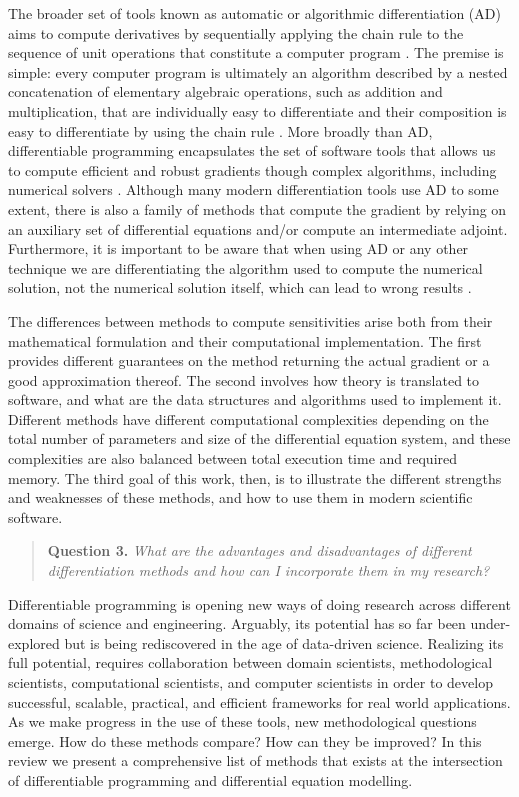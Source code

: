 The broader set of tools known as automatic or algorithmic differentiation (AD) aims to compute derivatives by sequentially applying the chain rule to the sequence of unit operations that constitute a computer program \cite{Griewank:2008kh, Naumann.2011}. 
The premise is simple: every computer program is ultimately an algorithm described by a nested concatenation of elementary algebraic operations, such as addition and multiplication, that are individually easy to differentiate and their composition is easy to differentiate by using the chain rule \cite{Giering:1998in}. 
More broadly than AD, differentiable programming encapsulates the set of software tools that allows us to compute efficient and robust gradients though complex algorithms, including numerical solvers \cite{Innes_Zygote}. 
Although many modern differentiation tools use AD to some extent, there is also a family of methods that compute the gradient by relying on an auxiliary set of differential equations and/or compute an intermediate adjoint. 
Furthermore, it is important to be aware that when using AD or any other technique we are differentiating the algorithm used to compute the numerical solution, not the numerical solution itself, which can lead to wrong results \cite{Eberhard_Bischof_1996}.

The differences between methods to compute sensitivities arise both from their mathematical formulation and their computational implementation. 
The first provides different guarantees on the method returning the actual gradient or a good approximation thereof. 
The second involves how theory is translated to software, and what are the data structures and algorithms used to implement it. 
Different methods have different computational complexities depending on the total number of parameters and size of the differential equation system, and these complexities are also balanced between total execution time and required memory. 
The third goal of this work, then, is to illustrate the different strengths and weaknesses of these methods, and how to use them in modern scientific software. 
\begin{quote}
    \textbf{Question 3. }
    \textit{What are the advantages and disadvantages of different differentiation methods and how can I incorporate them in my research?}
\end{quote}

Differentiable programming is opening new ways of doing research across different domains of science and engineering. 
Arguably, its potential has so far been under-explored but is being rediscovered in the age of data-driven science. 
Realizing its full potential, requires collaboration between domain scientists, methodological scientists, computational scientists, and computer scientists in order to develop successful, scalable, practical, and efficient frameworks for real world applications.
As we make progress in the use of these tools, new methodological questions emerge. 
How do these methods compare? How can they be improved? 
In this review we present a comprehensive list of methods that exists at the intersection of differentiable programming and differential equation modelling. 


